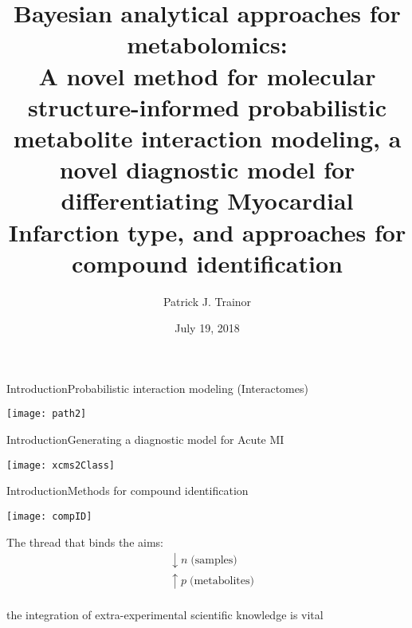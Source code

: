 \documentclass[xcolor=dvipsnames]{beamer}
\begin{document}
	
\title[Bayesian Methods for Metabolomics]{{\bf Bayesian analytical approaches for metabolomics:}\\ {\small A novel method for molecular structure-informed probabilistic metabolite interaction modeling, a novel diagnostic model for differentiating Myocardial Infarction type, and approaches for compound identification}}
\author[P.J. Trainor]{Patrick J. Trainor}
\date[July 2018]{July 19, 2018}

\begin{frame}
	\titlepage
\end{frame}

\begin{frame}{Introduction}{Probabilistic interaction modeling (Interactomes)}
	\vspace{-15pt}
	\begin{center}
		\texttt{[image: path2]}
	\end{center}
\end{frame}

\begin{frame}{Introduction}{Generating a diagnostic model for Acute MI}
	\vspace{-15pt}
	\begin{center}
		\texttt{[image: xcms2Class]}
	\end{center}
\end{frame}

\begin{frame}{Introduction}{Methods for compound identification}
	\vspace{-15pt}
	\begin{center}
		\texttt{[image: compID]}
	\end{center}
\end{frame}

\begin{frame}{}{}
	\vspace{-15pt}
	{\Huge
	The thread that binds the aims:
	\begin{align*}
		&\downarrow n \; \text{(samples)} \\
		&\uparrow p  \; \text{(metabolites)}
	\end{align*}}
	{\LARGE \\the integration of extra-experimental scientific knowledge is vital}

\end{frame}
\end{document}
